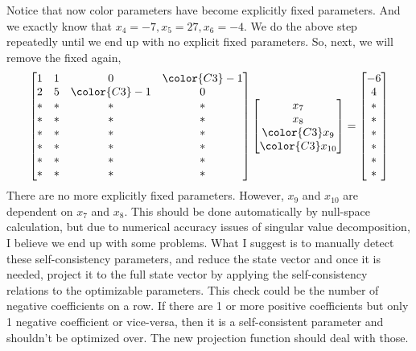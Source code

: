 Notice that now {\color{C2}color} parameters have become explicitly fixed parameters. And we exactly know that {\color{C1}$x_4 = -7, x_5 = 27, x_6 = -4$}. We do the above step repeatedly until we end up with no explicit fixed parameters. So, next, we will remove the fixed again,
\begin{equation*}
    \begin{bmatrix}
         1 &  1 & 0 & \color{C3}-1 \\
         2 &  5 & \color{C3}-1 &  0 \\
         * &  * & * &  *\\
         * &  * & * &  *\\
         * &  * & * &  *\\
         * &  * & * &  *\\
         * &  * & * &  *\\
         * &  * & * &  *\\
    \end{bmatrix}
    \begin{bmatrix}
        x_7 \\ 
        x_8 \\ 
        \color{C3} x_9 \\ 
        \color{C3} x_{10} 
    \end{bmatrix}
    =
    \begin{bmatrix}
        -6 \\ 4 \\ * \\ * \\ * \\ * \\ * \\ * 
    \end{bmatrix}
\end{equation*}
There are no more explicitly fixed parameters. However, {\color{C3}$x_9$ and $x_{10}$} are dependent on $x_7$ and $x_8$. This should be done automatically by null-space calculation, but due to numerical accuracy issues of singular value decomposition, I believe we end up with some problems. What I suggest is to manually detect these self-consistency parameters, and reduce the state vector and once it is needed, project it to the full state vector by applying the self-consistency relations to the optimizable parameters. This check could be the number of negative coefficients on a row. If there are 1 or more positive coefficients but only 1 negative coefficient or vice-versa, then it is a self-consistent parameter and shouldn't be optimized over. The new projection function should deal with those.
